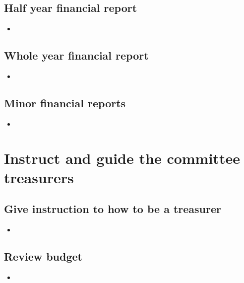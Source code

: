 \documentclass{report}
\begin{document}
\subsection{Half year financial report}

\begin{itemize} 
\vspace{-1mm}
\itemsep-1mm 
\item 
\end{itemize}

\subsection{Whole year financial report}

\begin{itemize} 
\vspace{-1mm}
\itemsep-1mm 
\item 
\end{itemize}

\subsection{Minor financial reports}

\begin{itemize} 
\vspace{-1mm}
\itemsep-1mm 
\item 
\end{itemize}

\section{Instruct and guide the committee treasurers}

\subsection{Give instruction to how to be a treasurer}
\begin{itemize} 
\vspace{-1mm}
\itemsep-1mm 
\item 
\end{itemize}

\subsection{Review budget}
\begin{itemize}
\vspace{-1mm}
\itemsep-1mm 
\item
\end{itemize}
\end{document}
